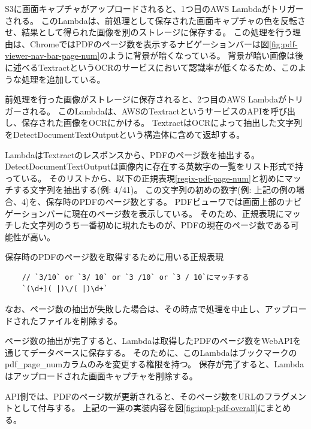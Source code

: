 S3に画面キャプチャがアップロードされると、1つ目のAWS Lambdaがトリガーされる。
このLambdaは、前処理として保存された画面キャプチャの色を反転させ、結果として得られた画像を別のストレージに保存する。
この処理を行う理由は、ChromeではPDFのページ数を表示するナビゲーションバーは図\ref{fig:pdf-viewer-nav-bar-page-num}のように背景が暗くなっている。
背景が暗い画像は後に述べるTextract\cite{textract}というOCRのサービスにおいて認識率が低くなるため、このような処理を追加している。

前処理を行った画像がストレージに保存されると、2つ目のAWS Lambdaがトリガーされる。
このLambdaは、AWSのTextractというサービスのAPIを呼び出し、保存された画像をOCRにかける。
TextractはOCRによって抽出した文字列をDetectDocumentTextOutput\cite{detect-document-text-output}という構造体に含めて返却する。

LambdaはTextractのレスポンスから、PDFのページ数を抽出する。
DetectDocumentTextOutputは画像内に存在する英数字の一覧をリスト形式で持っている。
そのリストから、以下の正規表現\ref{regix-pdf-page-num}と初めにマッチする文字列を抽出する(例: 4/41)。
この文字列の初めの数字(例: 上記の例の場合、4)を、保存時のPDFのページ数とする。
PDFビューワでは画面上部のナビゲーションバーに現在のページ数を表示している。
そのため、正規表現にマッチした文字列のうち一番初めに現れたものが、PDFの現在のページ数である可能性が高い。

\begin{itembox}[l]{保存時のPDFのページ数を取得するために用いる正規表現}
  \label{regix-pdf-page-num}
  \begin{verbatim}
    // `3/10` or `3/ 10` or `3 /10` or `3 / 10`にマッチする
    `(\d+)( |)\/( |)\d+`
  \end{verbatim}
\end{itembox}

なお、ページ数の抽出が失敗した場合は、その時点で処理を中止し、アップロードされたファイルを削除する。

ページ数の抽出が完了すると、Lambdaは取得したPDFのページ数をWebAPIを通じてデータベースに保存する。
そのために、このLambdaはブックマークのpdf\_page\_numカラムのみを変更する権限を持つ。
保存が完了すると、Lambdaはアップロードされた画面キャプチャを削除する。

API側では、PDFのページ数が更新されると、そのページ数をURLのフラグメントとして付与する。
上記の一連の実装内容を図\ref{fig:impl-pdf-overall}にまとめる。

